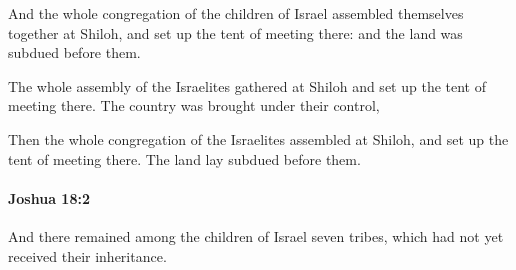 			\begin{versebox}
					\item[BHS] 
					\item[ASV] And the whole congregation of the children of Israel assembled themselves together at Shiloh, and set up the tent of meeting there: and the land was subdued before them.
					\item[NIV] The whole assembly of the Israelites gathered at Shiloh and set up the tent of meeting there. The country was brought under their control,
					\item[NRSV] Then the whole congregation of the Israelites assembled at Shiloh, and set up the tent of meeting there. The land lay subdued before them.
			\end{versebox}

		\paragraph{Joshua 18:2} %
			\label{JOSHUA-18-2}

			And there remained among the children of Israel seven tribes, which had not yet received their inheritance.

